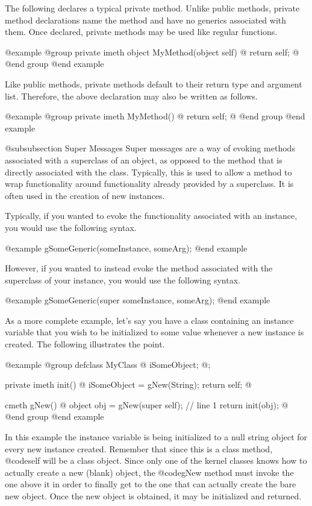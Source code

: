 The following declares a typical private method.  Unlike public
methods, private method declarations name the method and have
no generics associated with them.  Once declared, private methods may
be used like regular functions.


@example
@group
private imeth   object  MyMethod(object self)
@{
        return self;
@}
@end group
@end example


Like public methods, private methods default to their return type and
argument list.  Therefore, the above declaration may also be written as
follows.

@example
@group
private imeth   MyMethod()
@{
        return self;
@}
@end group
@end example


@subsubsection Super Messages
Super messages are a way of evoking methods associated with a superclass
of an object, as opposed to the method that is directly associated
with the class.  Typically, this is used to allow a method to wrap
functionality around functionality already provided by a superclass.
It is often used in the creation of new instances.

Typically, if you wanted to evoke the functionality associated with an
instance, you would use the following syntax.

@example
        gSomeGeneric(someInstance, someArg);
@end example

However, if you wanted to instead evoke the method associated with the
superclass of your instance, you would use the following syntax.

@example
        gSomeGeneric(super  someInstance, someArg);
@end example

As a more complete example, let's say you have a class containing an
instance variable that you wish to be initialized to some value
whenever a new instance is created.  The following illustrates the
point.

@example
@group
defclass  MyClass  @{
        iSomeObject;
@};

private imeth init()
@{
        iSomeObject = gNew(String);
        return self;
@}

cmeth  gNew()
@{
        object  obj = gNew(super self);  // line 1
        return init(obj);
@}
@end group
@end example

In this example the instance variable is being initialized to a null
string object for every new instance created.  Remember that since
this is a class method, @code{self} will be a class object.  Since
only one of the kernel classes knows how to actually create a new
(blank) object, the @code{gNew} method must invoke the one above it
in order to finally get to the one that can actually create the
bare new object.  Once the new object is obtained, it may be initialized
and returned.

